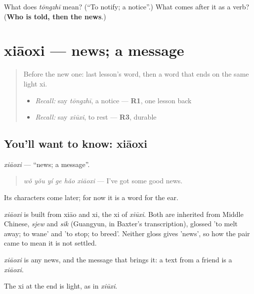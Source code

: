 \begin{tcolorbox}[breakable,colback=teal!4,colframe=teal!35!black,title={Before you move on}]
What does \emph{tōngzhī} mean? (\textquotedblleft{}To notify; a notice\textquotedblright{}.) What comes after it as a verb? (\textbf{Who is told, then the news}.)
\end{tcolorbox}
\section[xiāoxi]{xiāoxi — news; a message}

\label{lesson:ZH-C157-xiaoxi}



\begin{quote}
Before the new one: last lesson's word, then a word that ends on the same light xi.

\begin{itemize}
\raggedright
  \item \emph{Recall:} say \emph{tōngzhī}, a notice — \textbf{R1}, one lesson back
  \item \emph{Recall:} say \emph{xiūxi}, to rest — \textbf{R3}, durable
\end{itemize}
\end{quote}

\subsection*{You'll want to know: xiāoxi}
\emph{xiāoxi} — \textquotedblleft{}news; a message\textquotedblright{}.

\begin{quote}
\emph{wǒ yǒu yí ge hǎo xiāoxi} — I've got some good news.
\end{quote}

Its characters come later; for now it is a word for the ear.

\begin{cousinweb}
\emph{xiāoxi} is built from xiāo and xi, the xi of \emph{xiūxi}. Both are inherited from Middle Chinese, \emph{sjew} and \emph{sik} (Guangyun, in Baxter's transcription), glossed 'to melt away; to wane' and 'to stop; to breed'. Neither gloss gives 'news', so how the pair came to mean it is not settled.
\end{cousinweb}

\begin{grammarlens}[title={What you've built}]
\emph{xiāoxi} is any news, and the message that brings it: a text from a friend is a \emph{xiāoxi}.

The xi at the end is light, as in \emph{xiūxi}.
\end{grammarlens}

